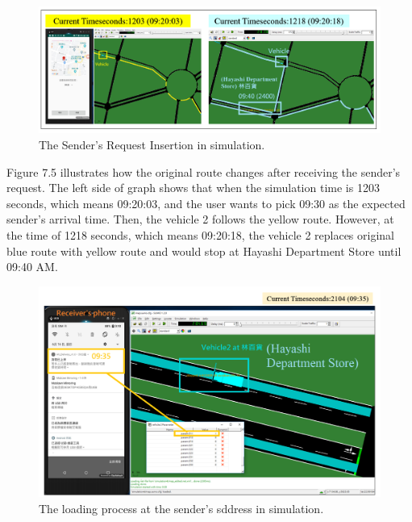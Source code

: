 \documentclass[12pt]{ksthesis}
\begin{document}
\begin{thesis}
{\begin{figure}[H]
\centering
\includegraphics[width=1.0\textwidth]{./Thesis_figures/F7-5_senderRequest.PNG}
\caption{\large The Sender’s Request Insertion in simulation.}
\vspace{0.5cm}
\label{Fig:sender_request}
\end{figure}

Figure 7.5 illustrates how the original route changes after receiving the sender’s request.
The left side of graph shows that when the simulation time is 1203 seconds, which means 09:20:03, and the user wants to pick 09:30 as the expected sender’s arrival time. Then, the vehicle 2 follows the yellow route. 
However, at the time of 1218 seconds, which means 09:20:18, the vehicle 2 replaces original blue route with yellow route and would stop at Hayashi Department Store until 09:40 AM.


\begin{figure}[H]
\centering
\includegraphics[width=1.0\textwidth]{./Thesis_figures/F7-6_loadingProcess.PNG}
\caption{\large The loading process at the sender’s sddress in simulation.}
\vspace{0.5cm}
\label{Fig:LoadingProcess}
\end{figure}

}
\end{thesis}
\end{document}
